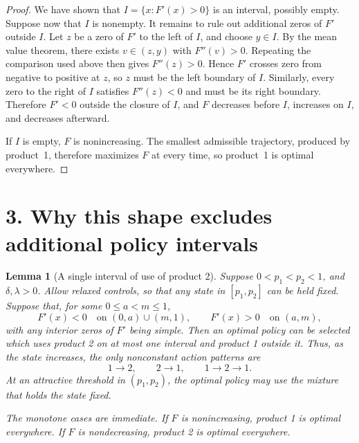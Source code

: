 \documentclass[11pt]{article}
\newtheorem{lemma}{Lemma}
\begin{document}
\begin{proof}
We have shown that $I=\{x:F'(x)>0\}$ is an interval, possibly empty. Suppose now that $I$ is nonempty. It remains to rule out additional zeros of $F'$ outside $I$. Let $z$ be a zero of $F'$ to the left of $I$, and choose $y\in I$. By the mean value theorem, there exists $v\in(z,y)$ with $F''(v)>0$. Repeating the comparison used above then gives $F''(z)>0$. Hence $F'$ crosses zero from negative to positive at $z$, so $z$ must be the left boundary of $I$. Similarly, every zero to the right of $I$ satisfies $F''(z)<0$ and must be its right boundary. Therefore $F'<0$ outside the closure of $I$, and $F$ decreases before $I$, increases on $I$, and decreases afterward.

If $I$ is empty, $F$ is nonincreasing. The smallest admissible trajectory,
produced by product~1, therefore maximizes $F$ at every time, so product~1
is optimal everywhere.
\end{proof}

\section*{3. Why this shape excludes additional policy intervals}
\begin{lemma}[A single interval of use of product 2]
\label{lem:fluid-single-interval}
Suppose $0<p_1<p_2<1$, and $\delta,\lambda>0$.
Allow relaxed controls, so that any state in $[p_1,p_2]$ can be held fixed.
Suppose that, for some $0\leq a<m\leq 1$,
\begin{equation}
       F'(x)<0 \quad \text{on } (0,a)\cup(m,1),
       \qquad
       F'(x)>0 \quad \text{on } (a,m),
\end{equation}
with any interior zeros of $F'$ being simple. Then an optimal policy can be
selected which uses product 2 on at most one interval and product 1 outside it.
Thus, as the state increases, the only nonconstant action patterns are
\begin{equation}
       1\to2,\qquad 2\to1,\qquad 1\to2\to1.
\end{equation}
At an attractive threshold in $(p_1,p_2)$, the optimal policy may use the
mixture that holds the state fixed.

The monotone cases are immediate. If $F$ is nonincreasing, product 1 is optimal
everywhere. If $F$ is nondecreasing, product 2 is optimal everywhere.
\end{lemma}
\end{document}
